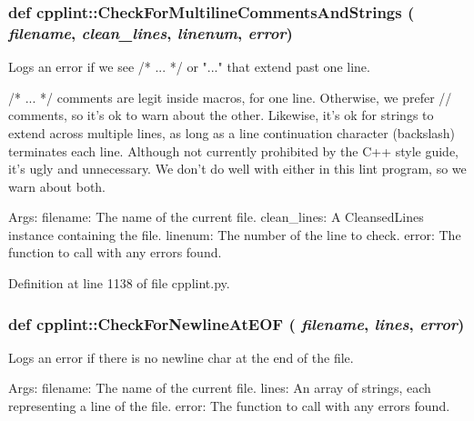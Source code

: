 \hypertarget{namespacecpplint_ae319b3dce42ad005bcddfd3d4df9656d}{
\subsubsection[{CheckForMultilineCommentsAndStrings}]{\setlength{\rightskip}{0pt plus 5cm}def cpplint::CheckForMultilineCommentsAndStrings ( {\em filename}, \/   {\em clean\_\-lines}, \/   {\em linenum}, \/   {\em error})}}
\label{namespacecpplint_ae319b3dce42ad005bcddfd3d4df9656d}
\begin{DoxyVerb}Logs an error if we see /* ... */ or "..." that extend past one line.

/* ... */ comments are legit inside macros, for one line.
Otherwise, we prefer // comments, so it's ok to warn about the
other.  Likewise, it's ok for strings to extend across multiple
lines, as long as a line continuation character (backslash)
terminates each line. Although not currently prohibited by the C++
style guide, it's ugly and unnecessary. We don't do well with either
in this lint program, so we warn about both.

Args:
  filename: The name of the current file.
  clean_lines: A CleansedLines instance containing the file.
  linenum: The number of the line to check.
  error: The function to call with any errors found.
\end{DoxyVerb}
 

Definition at line 1138 of file cpplint.py.

\hypertarget{namespacecpplint_a84408591ac7ff7e427560a252360070b}{
\subsubsection[{CheckForNewlineAtEOF}]{\setlength{\rightskip}{0pt plus 5cm}def cpplint::CheckForNewlineAtEOF ( {\em filename}, \/   {\em lines}, \/   {\em error})}}
\label{namespacecpplint_a84408591ac7ff7e427560a252360070b}
\begin{DoxyVerb}Logs an error if there is no newline char at the end of the file.

Args:
  filename: The name of the current file.
  lines: An array of strings, each representing a line of the file.
  error: The function to call with any errors found.
\end{DoxyVerb}
 

